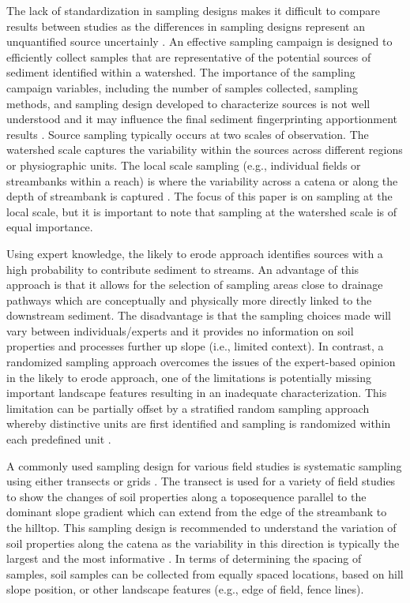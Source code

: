 \documentclass[
  number]{elsarticle}
\begin{document}
The lack of standardization in sampling designs makes it difficult to
compare results between studies as the differences in sampling designs
represent an unquantified source uncertainly
\citep[e.g.,][]{koiter2013}. An effective sampling campaign is designed
to efficiently collect samples that are representative of the potential
sources of sediment identified within a watershed. The importance of the
sampling campaign variables, including the number of samples collected,
sampling methods, and sampling design developed to characterize sources
is not well understood and it may influence the final sediment
fingerprinting apportionment results \citep{collins2020}. Source
sampling typically occurs at two scales of observation. The watershed
scale captures the variability within the sources across different
regions or physiographic units. The local scale sampling (e.g.,
individual fields or streambanks within a reach) is where the
variability across a catena or along the depth of streambank is captured
\citep{collins2020}. The focus of this paper is on sampling at the local
scale, but it is important to note that sampling at the watershed scale
is of equal importance.

Using expert knowledge, the likely to erode approach identifies sources
with a high probability to contribute sediment to streams. An advantage
of this approach is that it allows for the selection of sampling areas
close to drainage pathways which are conceptually and physically more
directly linked to the downstream sediment. The disadvantage is that the
sampling choices made will vary between individuals/experts and it
provides no information on soil properties and processes further up
slope (i.e., limited context). In contrast, a randomized sampling
approach overcomes the issues of the expert-based opinion in the likely
to erode approach, one of the limitations is potentially missing
important landscape features resulting in an inadequate
characterization. This limitation can be partially offset by a
stratified random sampling approach whereby distinctive units are first
identified and sampling is randomized within each predefined unit
\citep{pennock2008}.

A commonly used sampling design for various field studies is systematic
sampling using either transects \citep[e.g.,][]{du2017} or grids
\citep[e.g.,][]{lauzon2005}. The transect is used for a variety of field
studies to show the changes of soil properties along a toposequence
parallel to the dominant slope gradient which can extend from the edge
of the streambank to the hilltop. This sampling design is recommended to
understand the variation of soil properties along the catena as the
variability in this direction is typically the largest and the most
informative \citep{pennock2008}. In terms of determining the spacing of
samples, soil samples can be collected from equally spaced locations,
based on hill slope position, or other landscape features (e.g., edge of
field, fence lines).
\end{document}
